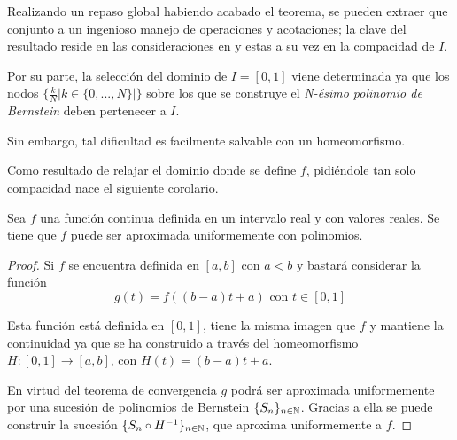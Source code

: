 %

Realizando un repaso global habiendo acabado el teorema, se pueden extraer que conjunto a un ingenioso manejo de operaciones y acotaciones; la clave del resultado reside  en las consideraciones
en   y estas a su vez en la 
compacidad de $I$.

Por su parte, la selección del dominio de $I = [0,1]$ viene determinada ya que 
 los nodos $\{ \frac{k}{N} | k\in \{0,..., N\} |  \}$ sobre los que se construye el \textit{N-ésimo polinomio de Bernstein}  deben pertenecer a $I$.

Sin embargo, tal dificultad es facilmente salvable con un homeomorfismo. 

Como resultado de relajar el dominio donde se define $f$, pidiéndole tan solo
compacidad nace el siguiente corolario.  

\begin{corolario} \label{teo:TeoremaAproximacionWeierstrass}
    Sea $f$ una función continua definida en un intervalo real y con valores reales. Se tiene que $f$ puede ser aproximada uniformemente con polinomios. 
\end{corolario}  

\begin{proof}
    Si $f$ se encuentra definida en $[a,b]$ con $a<b$ y bastará considerar la función
    \begin{equation*}
        g(t) = f( (b-a)t + a) \text{ con } t \in [0,1]
    \end{equation*}

    Esta función está definida en $[0,1]$, tiene la misma imagen que $f$ y 
    mantiene la continuidad ya que se ha construido a través del homeomorfismo 
    $H:[0,1] \longrightarrow [a,b]$, con $H(t) = (b-a)t + a$. 

    En virtud del teorema de convergencia 
    $g$ podrá ser aproximada uniformemente por una sucesión de polinomios de Bernstein $\{S_n\}_{n \in \mathbb{N}}$. Gracias a ella se puede
    construir la sucesión $\{S_n \circ H^{-1}\}_{n \in \mathbb{N}}$, que aproxima uniformemente a $f$. 
\end{proof}